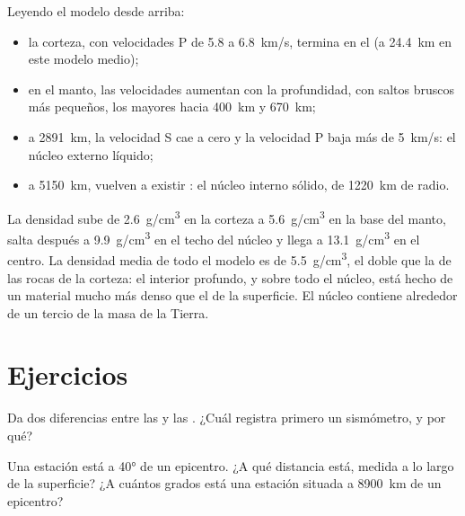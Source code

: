 Leyendo el modelo desde arriba:
\begin{itemize}
  \item la corteza, con velocidades P de 5.8 a \qty{6.8}{km/s}, termina en el
         (a \qty{24.4}{km} en este modelo medio);
  \item en el manto, las velocidades aumentan con la profundidad, con saltos
        bruscos más pequeños, los mayores hacia \qty{400}{km} y \qty{670}{km};
  \item a \qty{2891}{km}, la velocidad S cae a cero y la velocidad P baja más
        de \qty{5}{km/s}: el núcleo externo líquido;
  \item a \qty{5150}{km}, vuelven a existir : el núcleo interno sólido,
        de \qty{1220}{km} de radio.
\end{itemize}

La densidad sube de \qty{2.6}{g/cm^3} en la corteza a \qty{5.6}{g/cm^3} en
la base del manto, salta después a \qty{9.9}{g/cm^3} en el techo del núcleo
y llega a \qty{13.1}{g/cm^3} en el centro. La densidad media de todo el
modelo es de \qty{5.5}{g/cm^3}, el doble que la de las rocas de la corteza:
el interior profundo, y sobre todo el núcleo, está hecho de un material
mucho más denso que el de la superficie. El núcleo contiene alrededor de un
tercio de la masa de la Tierra.

\section{Ejercicios}

\begin{exercise}[$\star$]\label{exo:g11:seismic-structure:1}
Da dos diferencias entre las  y las . ¿Cuál registra primero un
sismómetro, y por qué?
\end{exercise}

\begin{exercise}[$\star$]\label{exo:g11:seismic-structure:2}
Una estación está a \ang{40} de un epicentro. ¿A qué distancia está, medida a
lo largo de la superficie? ¿A cuántos grados está una estación situada a
\qty{8900}{km} de un epicentro?
\end{exercise}

